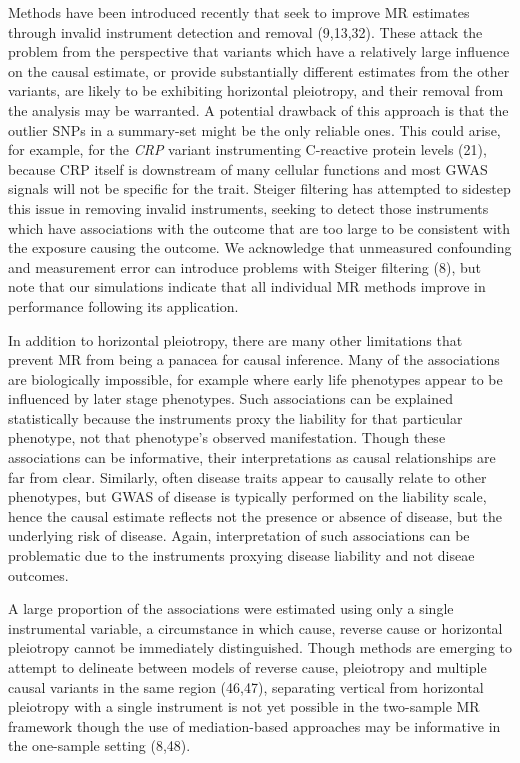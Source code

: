 \documentclass[]{article}
\begin{document}
Methods have been introduced recently that seek to improve MR estimates
through invalid instrument detection and removal (9,13,32). These attack
the problem from the perspective that variants which have a relatively
large influence on the causal estimate, or provide substantially
different estimates from the other variants, are likely to be exhibiting
horizontal pleiotropy, and their removal from the analysis may be
warranted. A potential drawback of this approach is that the outlier
SNPs in a summary-set might be the only reliable ones. This could arise,
for example, for the \emph{CRP} variant instrumenting C-reactive protein
levels (21), because CRP itself is downstream of many cellular functions
and most GWAS signals will not be specific for the trait. Steiger
filtering has attempted to sidestep this issue in removing invalid
instruments, seeking to detect those instruments which have associations
with the outcome that are too large to be consistent with the exposure
causing the outcome. We acknowledge that unmeasured confounding and
measurement error can introduce problems with Steiger filtering (8), but
note that our simulations indicate that all individual MR methods
improve in performance following its application.

In addition to horizontal pleiotropy, there are many other limitations
that prevent MR from being a panacea for causal inference. Many of the
associations are biologically impossible, for example where early life
phenotypes appear to be influenced by later stage phenotypes. Such
associations can be explained statistically because the instruments
proxy the liability for that particular phenotype, not that phenotype's
observed manifestation. Though these associations can be informative,
their interpretations as causal relationships are far from clear.
Similarly, often disease traits appear to causally relate to other
phenotypes, but GWAS of disease is typically performed on the liability
scale, hence the causal estimate reflects not the presence or absence of
disease, but the underlying risk of disease. Again, interpretation of
such associations can be problematic due to the instruments proxying
disease liability and not diseae outcomes.

A large proportion of the associations were estimated using only a
single instrumental variable, a circumstance in which cause, reverse
cause or horizontal pleiotropy cannot be immediately distinguished.
Though methods are emerging to attempt to delineate between models of
reverse cause, pleiotropy and multiple causal variants in the same
region (46,47), separating vertical from horizontal pleiotropy with a
single instrument is not yet possible in the two-sample MR framework
though the use of mediation-based approaches may be informative in the
one-sample setting (8,48).
\end{document}
